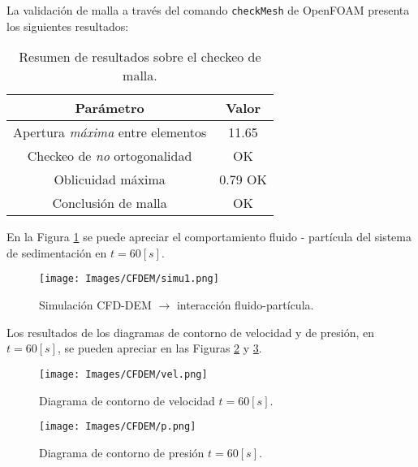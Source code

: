\noindent
\justify

La validaci\'on de malla a trav\'es del comando \texttt{checkMesh} de OpenFOAM presenta los siguientes resultados:

\begin{table}[h!]
	\centering
	\begin{tabular}{|c|c|}
		\hline
		\textbf{Par\'ametro} & \textbf{Valor} \\ \hline
		Apertura \textit{m\'axima} entre elementos & 11.65 \\ \hline
		Checkeo de \textit{no} ortogonalidad & OK \\ \hline
		Oblicuidad m\'axima & 0.79 OK \\ \hline
		Conclusi\'on de malla & OK \\ \hline
	\end{tabular}
	\caption{Resumen de resultados sobre el checkeo de malla.}
	\label{check}
\end{table}

\noindent
\justify

En la Figura \ref{CFDEM:fpart} se puede apreciar el comportamiento fluido - part\'icula del sistema de sedimentaci\'on en $t = 60 [s]$.

\begin{figure}[h!]
	\centering
	\texttt{[image: Images/CFDEM/simu1.png]}
	\caption{Simulaci\'on CFD-DEM $\rightarrow$ interacci\'on fluido-part\'icula.}
	\label{CFDEM:fpart}
\end{figure}

\noindent
\justify

Los resultados de los diagramas de contorno de velocidad y de presi\'on, en $t = 60 [s]$, se pueden apreciar en las Figuras \ref{CFDEM:vel} y \ref{CFDEM:p}.

\begin{figure}[h!]
	\centering
	\texttt{[image: Images/CFDEM/vel.png]}
	\caption{Diagrama de contorno de velocidad $t = 60 [s]$.}
	\label{CFDEM:vel}
\end{figure}

\begin{figure}[h!]
	\centering
	\texttt{[image: Images/CFDEM/p.png]}
	\caption{Diagrama de contorno de presi\'on $t=60 [s]$.}
	\label{CFDEM:p}
\end{figure}